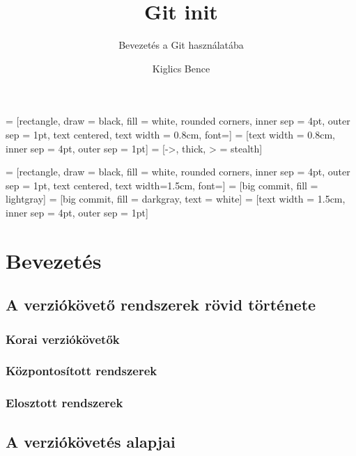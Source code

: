 \documentclass[display,t]{beamer}
\title{Git init}
\subtitle{Bevezetés a Git használatába}
\author{Kiglics Bence}
\begin{document}
 = [rectangle, draw = black, fill = white, rounded corners,
                      inner sep = 4pt, outer sep = 1pt, text centered,
                      text width = 0.8cm, font=\small]
 = [text width = 0.8cm, inner sep = 4pt, outer sep = 1pt]
 = [->, thick, > = stealth]

 = [rectangle, draw = black, fill = white, rounded corners,
                          inner sep = 4pt, outer sep = 1pt, text centered,
                          text width=1.5cm, font=\small]
     = [big commit, fill = lightgray]
        = [big commit, fill = darkgray, text = white]
 = [text width = 1.5cm, inner sep = 4pt, outer sep = 1pt]


\frame{\titlepage}



\section{Bevezetés}
\subsection{A verziókövető rendszerek rövid története}
\subsubsection{Korai verziókövetők}



\subsubsection{Központosított rendszerek}



\subsubsection{Elosztott rendszerek}




\subsection{A verziókövetés alapjai}

\end{document}
